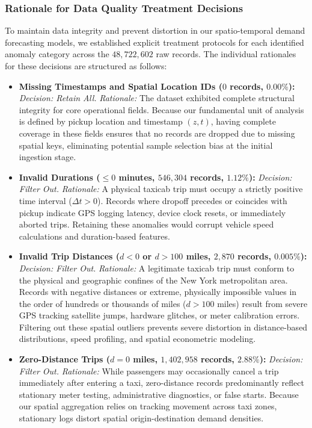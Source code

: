 \documentclass[11pt,a4paper]{article}
\begin{document}
\subsubsection{Rationale for Data Quality Treatment Decisions}
To maintain data integrity and prevent distortion in our spatio-temporal demand forecasting models, we established explicit treatment protocols for each identified anomaly category across the $48,722,602$ raw records. The individual rationales for these decisions are structured as follows:
\begin{itemize}
    \item \textbf{Missing Timestamps and Spatial Location IDs ($0$ records, $0.00\%$):} 
    \textit{Decision: Retain All.} 
    \textit{Rationale:} The dataset exhibited complete structural integrity for core operational fields. Because our fundamental unit of analysis is defined by pickup location and timestamp $(z, t)$, having complete coverage in these fields ensures that no records are dropped due to missing spatial keys, eliminating potential sample selection bias at the initial ingestion stage.

    \item \textbf{Invalid Durations ($\le 0$ minutes, $546,304$ records, $1.12\%$):} 
    \textit{Decision: Filter Out.} 
    \textit{Rationale:} A physical taxicab trip must occupy a strictly positive time interval ($\Delta t > 0$). Records where dropoff precedes or coincides with pickup indicate GPS logging latency, device clock resets, or immediately aborted trips. Retaining these anomalies would corrupt vehicle speed calculations and duration-based features.
    
    \item \textbf{Invalid Trip Distances ($d < 0$ or $d > 100$ miles, $2,870$ records, $0.005\%$):} 
    \textit{Decision: Filter Out.} 
    \textit{Rationale:} A legitimate taxicab trip must conform to the physical and geographic confines of the New York metropolitan area. Records with negative distances or extreme, physically impossible values in the order of hundreds or thousands of miles ($d > 100$ miles) result from severe GPS tracking satellite jumps, hardware glitches, or meter calibration errors. Filtering out these spatial outliers prevents severe distortion in distance-based distributions, speed profiling, and spatial econometric modeling.

    \item \textbf{Zero-Distance Trips ($d = 0$ miles, $1,402,958$ records, $2.88\%$):} 
    \textit{Decision: Filter Out.} 
    \textit{Rationale:} While passengers may occasionally cancel a trip immediately after entering a taxi, zero-distance records predominantly reflect stationary meter testing, administrative diagnostics, or false starts. Because our spatial aggregation relies on tracking movement across taxi zones, stationary logs distort spatial origin-destination demand densities.


\end{itemize}
\end{document}

